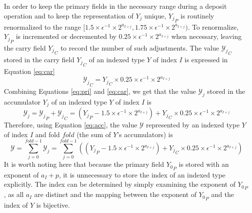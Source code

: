 \documentclass[12pt]{article}
\theoremstyle{plain}
\numberwithin{equation}{section}
\begin{document}
      In order to keep the primary fields in the necessary range during a deposit operation and to keep the representation of $Y_j$ unique, ${Y_j}_P$ is routinely renormalized to the range $[1.5 \times\epsilon^{-1} \times 2^{a_{I + j}}, 1.75 \times\epsilon^{-1} \times 2^{a_{I + j}})$.
      To renormalize, ${Y_j}_P$ is incremented or decremented by $0.25 \times\epsilon^{-1} \times 2^{a_{I + j}}$ when necessary, leaving the carry field ${Y_j}_C$ to record the number of such adjustments.
      The value ${\mathcal{Y}_j}_C$ stored in the carry field ${Y_j}_C$ of an indexed type $Y$ of index $I$ is expressed in Equation \ref{eq:car}
      \begin{equation}
        {\mathcal{Y}_j}_C = {Y_j}_C \times 0.25\times\epsilon^{-1}\times2^{a_{I + j}}
        \label{eq:car}
      \end{equation}
      Combining Equations \ref{eq:pri} and \ref{eq:car}, we get that the value $\mathcal{Y}_j$ stored in the accumulator $Y_j$ of an indexed type $Y$ of index $I$ is
      \begin{equation}
        \mathcal{Y}_j = {\mathcal{Y}_j}_P + {\mathcal{Y}_j}_C = ({Y_j}_P - 1.5 \times\epsilon^{-1}\times 2^{a_{I + j}}) + {Y_j}_C \times 0.25\times\epsilon^{-1}\times2^{a_{I + j}}
        \label{eq:acc}
      \end{equation}
      Therefore, using Equation \ref{eq:acc}, the value $\mathcal{Y}$ represented by an indexed type $Y$ of index $I$ and fold $fold$ (the sum of $Y$'s accumulators) is
      \begin{equation}
        \mathcal{Y} = \sum\limits_{j = 0}^{fold - 1} \mathcal{Y}_j = \sum\limits_{j = 0}^{fold - 1} (({Y_j}_P - 1.5 \times\epsilon^{-1}\times 2^{a_{I + j}}) + {Y_j}_C \times 0.25\times\epsilon^{-1}\times2^{a_{I + j}})
        \label{eq:indexedvalue}
      \end{equation}
      It is worth noting here that because the primary field ${Y_0}_P$ is stored with an exponent of $a_I + p$, it is unnecessary to store the index of an indexed type explicitly. The index can be determined by simply examining the exponent of ${Y_0}_P$, as all $a_I$ are distinct and the mapping between the exponent of ${Y_0}_P$ and the index of $Y$ is bijective.
\end{document}
